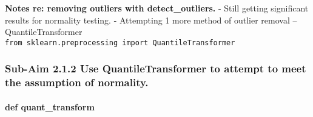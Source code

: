 \documentclass[11pt]{article}
\begin{document}
    \textbf{Notes re: removing outliers with detect\_outliers.} - Still
getting significant results for normality testing. - Attempting 1 more
method of outlier removal -- QuantileTransformer
\texttt{from\ sklearn.preprocessing\ import\ QuantileTransformer}

    \hypertarget{sub-aim-2.1.2-use-quantiletransformer-to-attempt-to-meet-the-assumption-of-normality.}{%
\subsubsection{Sub-Aim 2.1.2 Use QuantileTransformer to attempt to meet
the assumption of
normality.}\label{sub-aim-2.1.2-use-quantiletransformer-to-attempt-to-meet-the-assumption-of-normality.}}

    \hypertarget{def-quant_transform}{%
\paragraph{def quant\_transform}\label{def-quant_transform}}
\end{document}
